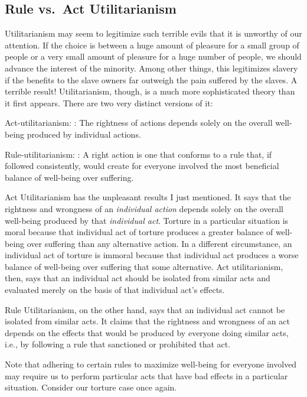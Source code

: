 \documentclass[]{article}
\begin{document}
\subsection{Rule vs.~Act
Utilitarianism}\label{rule-vs.act-utilitarianism}

Utilitarianism may seem to legitimize such terrible evils that it is
unworthy of our attention. If the choice is between a huge amount of
pleasure for a small group of people or a very small amount of pleasure
for a huge number of people, we should advance the interest of the
minority. Among other things, this legitimizes slavery if the benefits
to the slave owners far outweigh the pain suffered by the slaves. A
terrible result! Utilitarianism, though, is a much more sophisticated
theory than it first appears. There are two very distinct versions of
it:

Act-utilitarianism: : The rightness of actions depends solely on the
overall well-being produced by individual actions.

Rule-utilitarianism: : A right action is one that conforms to a rule
that, if followed consistently, would create for everyone involved the
most beneficial balance of well-being over suffering.

Act Utilitarianism has the unpleasant results I just mentioned. It says
that the rightness and wrongness of an \emph{individual action} depends
solely on the overall well-being produced by that \emph{individual act}.
Torture in a particular situation is moral because that individual act
of torture produces a greater balance of well-being over suffering than
any alternative action. In a different circumstance, an individual act
of torture is immoral because that individual act produces a worse
balance of well-being over suffering that some alternative. Act
utilitarianism, then, says that an individual act should be isolated
from similar acts and evaluated merely on the basis of that individual
act's effects.

Rule Utilitarianism, on the other hand, says that an individual act
cannot be isolated from similar acts. It claims that the rightness and
wrongness of an act depends on the effects that would be produced by
everyone doing similar acts, i.e., by following a rule that sanctioned
or prohibited that act.

Note that adhering to certain rules to maximize well-being for everyone
involved may require us to perform particular acts that have bad effects
in a particular situation. Consider our torture case once again.
\end{document}
